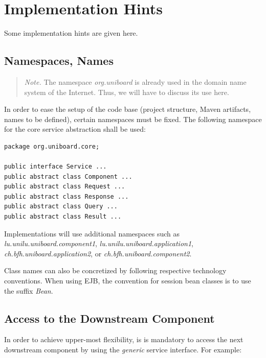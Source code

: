 \documentclass[oneside]{scrreprt}
\begin{document}
\chapter{Implementation Hints}

Some implementation hints are given here.

\section{Namespaces, Names}

\begin{quote}
	\emph{Note.} The namespace \emph{org.uniboard} is already
	used in the domain name system of the Internet. Thus,
	we will have to discuss its use here.
\end{quote}

In order to ease the setup of the code base (project structure,
Maven artifacts, names to be defined), certain namespaces must be fixed.
The following namespace for the core service abstraction shall
be used:

\begin{lstlisting}
package org.uniboard.core;

public interface Service ...
public abstract class Component ...
public abstract class Request ...
public abstract class Response ...
public abstract class Query ...
public abstract class Result ...
\end{lstlisting}

Implementations will use additional namespaces such as
\emph{lu.unilu.uniboard.component1},
\emph{lu.unilu.uniboard.application1},
\emph{ch.bfh.uniboard.application2}, or
\emph{ch.bfh.uniboard.component2}.

Class names can also be concretized by following respective
technology conventions. When using EJB, the convention for
session bean classes is to use the suffix \emph{Bean}.


\section{Access to the Downstream Component}

In order to achieve upper-most flexibility, is is mandatory to
access the next downstream component by using the \emph{generic}
service interface. For example:
\end{document}
